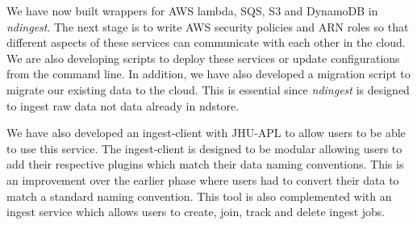 \documentclass[simplex.tex]{subfiles}
\begin{document}
We have now built wrappers for AWS lambda, SQS, S3 and DynamoDB  in \textit{ndingest}. The next stage is to write AWS security policies and ARN roles so that different aspects of these services can communicate with each other in the cloud. We are also developing scripts to deploy these services or update configurations from the command line. In addition, we have also developed a migration script to migrate our existing data to the cloud. This is essential since \textit{ndingest} is designed to ingest raw data not data already in ndstore.


We have also developed an ingest-client with JHU-APL to allow users to be able to use this service. The ingest-client is designed to be modular allowing users to add their respective plugins which match their data naming conventions. This is an improvement over the earlier phase where users had to convert their data to match a standard naming convention. This tool is also complemented with an ingest service which allows users to create, join, track and delete ingest jobs. 
\end{document}
